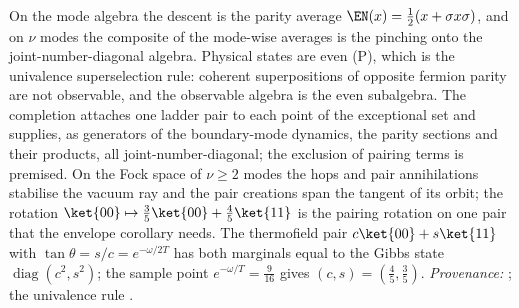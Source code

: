 On the mode algebra the descent is the parity average $\EN(x) = \tfrac12(x + \sigma x\sigma)$, and on $\nu$ modes the composite of the mode-wise averages is the pinching onto the joint-number-diagonal algebra. Physical states are even (P), which is the univalence superselection rule: coherent superpositions of opposite fermion parity are not observable, and the observable algebra is the even subalgebra. The completion attaches one ladder pair to each point of the exceptional set and supplies, as generators of the boundary-mode dynamics, the parity sections and their products, all joint-number-diagonal; the exclusion of pairing terms is premised. On the Fock space of $\nu \geq 2$ modes the hops and pair annihilations stabilise the vacuum ray and the pair creations span the tangent of its orbit; the rotation $\ket{00} \mapsto \tfrac35\ket{00} + \tfrac45\ket{11}$ is the pairing rotation on one pair that the envelope corollary needs. The thermofield pair $c\ket{00} + s\ket{11}$ with $\tan\theta = s/c = e^{-\omega/2T}$ has both marginals equal to the Gibbs state $\operatorname{diag}(c^{2}, s^{2})$; the sample point $e^{-\omega/T} = \tfrac{9}{16}$ gives $(c, s) = (\tfrac45, \tfrac35)$. \emph{Provenance:} \cite[Thm.~5.7, Prop.~9.6, Prem.~7.8, Fact~7.9, Prem.~7.30, Thm.~C.8, Prop.~13.4, Cor.~11.6, Lem.~7.2, Thm.~7.27]{ButlerT5}; the univalence rule \cite{WWW1952}.
